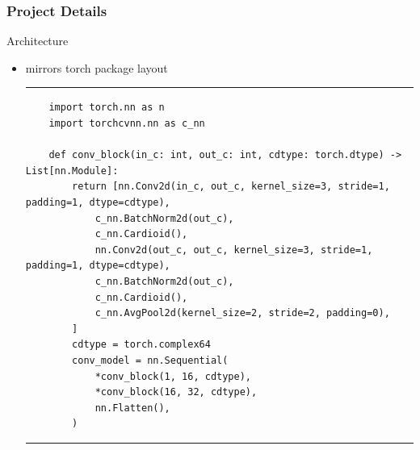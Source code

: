 \documentclass[aspectratio=169,10pt]{beamer}
\begin{document}
\begin{frame}[fragile]
\frametitle{Project Details}

\begin{block}{Architecture}
\begin{itemize}
\item mirrors torch package layout
\rule{\textwidth}{1pt}
\scriptsize
\begin{verbatim}
    import torch.nn as n
    import torchcvnn.nn as c_nn
    
    def conv_block(in_c: int, out_c: int, cdtype: torch.dtype) -> List[nn.Module]:
        return [nn.Conv2d(in_c, out_c, kernel_size=3, stride=1, padding=1, dtype=cdtype),
            c_nn.BatchNorm2d(out_c),
            c_nn.Cardioid(),
            nn.Conv2d(out_c, out_c, kernel_size=3, stride=1, padding=1, dtype=cdtype),
            c_nn.BatchNorm2d(out_c),
            c_nn.Cardioid(),
            c_nn.AvgPool2d(kernel_size=2, stride=2, padding=0),
        ]
        cdtype = torch.complex64
        conv_model = nn.Sequential(
            *conv_block(1, 16, cdtype),
            *conv_block(16, 32, cdtype),
            nn.Flatten(),
        )
\end{verbatim}
\rule{\textwidth}{1pt}
\end{itemize}
\end{block}

\end{frame}
\end{document}
